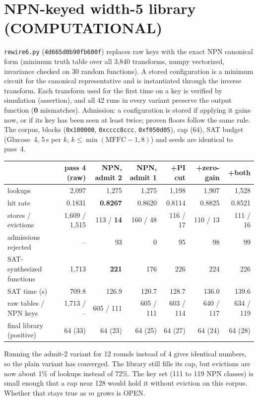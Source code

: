 \documentclass[11pt]{article}
\begin{document}
\section{NPN-keyed width-5 library (COMPUTATIONAL)}
\texttt{rewire6.py} (\texttt{4d665d0b90fb600f}) replaces raw keys with the exact NPN canonical form (minimum truth table over all 3{,}840 transforms, numpy vectorized, invariance checked on 30 random functions). A stored configuration is a minimum circuit for the canonical representative and is instantiated through the inverse transform. Each transform used for the first time on a key is verified by simulation (assertion), and all 42 runs in every variant preserve the output function (\textbf{0} mismatches). Admission: a configuration is stored if applying it gains now, or if its key has been seen at least twice; proven floors follow the same rule. The corpus, blocks (\texttt{0x100000}, \texttt{0xcccc8ccc}, \texttt{0xf050d05}), cap (64), SAT budget (Glucose~4, 5\,s per $k$, $k\le\min(\mathrm{MFFC}-1,8)$) and seeds are identical to pass~4.
\begin{center}\small\setlength{\tabcolsep}{4pt}\begin{tabular}{lrrrrrr}\toprule
& pass 4 (raw) & NPN, admit 2 & NPN, admit 1 & +PI cut & +zero-gain & +both\\\midrule
lookups & 2{,}097 & 1{,}275 & 1{,}275 & 1{,}198 & 1{,}907 & 1{,}528\\
hit rate & 0.1831 & \textbf{0.8267} & 0.8620 & 0.8114 & 0.8825 & 0.8521\\
stores / evictions & 1{,}609 / 1{,}515 & 113 / \textbf{14} & 160 / 48 & 116 / 17 & 110 / 13 & 111 / 16\\
admissions rejected & -- & 93 & 0 & 95 & 98 & 99\\
SAT-synthesized functions & 1{,}713 & \textbf{221} & 176 & 226 & 224 & 226\\
SAT time (s) & 709.8 & 126.9 & 120.7 & 128.7 & 136.0 & 139.6\\
raw tables / NPN keys & 1{,}713 / -- & 605 / 111 & 605 / 111 & 603 / 114 & 640 / 117 & 634 / 119\\
final library (positive) & 64 (33) & 64 (23) & 64 (25) & 64 (27) & 64 (24) & 64 (28)\\\bottomrule
\end{tabular}\end{center}
Running the admit-2 variant for 12 rounds instead of 4 gives identical numbers, so the plain variant has converged. The library still fills its cap, but evictions are now about 1\% of lookups instead of 72\%. The key set (111 to 119 NPN classes) is small enough that a cap near 128 would hold it without eviction on this corpus. Whether that stays true as $m$ grows is OPEN.
\end{document}

